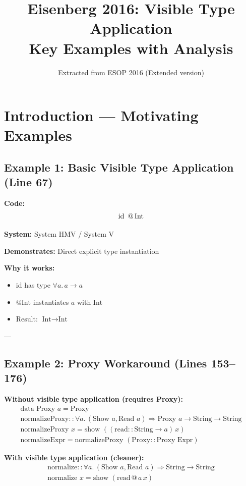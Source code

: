 \documentclass[11pt,a4paper]{article}
\title{Eisenberg 2016: Visible Type Application \\ Key Examples with Analysis}
\author{Extracted from ESOP 2016 (Extended version)}
\date{}
\begin{document}
\maketitle

\tableofcontents

\section{Introduction --- Motivating Examples}

\subsection{Example 1: Basic Visible Type Application (Line 67)}

\textbf{Code:}
\[
\text{id \,@\,Int}
\]

\textbf{System:} System HMV / System V

\textbf{Demonstrates:} Direct explicit type instantiation

\textbf{Why it works:}
\begin{itemize}
\item $\text{id}$ has type $\forall a.\, a \to a$
\item $@\text{Int}$ instantiates $a$ with $\text{Int}$
\item Result: $\text{Int} \to \text{Int}$
\end{itemize}

---

\subsection{Example 2: Proxy Workaround (Lines 153--176)}

\textbf{Without visible type application (requires Proxy):}
\[
\begin{array}{l}
\text{data Proxy } a = \text{Proxy} \\[6pt]
\text{normalizeProxy} :: \forall a.\, (\text{Show } a, \text{Read } a) \Rightarrow \text{Proxy } a \to \text{String} \to \text{String} \\
\text{normalizeProxy } x = \text{show } ((\text{read} :: \text{String} \to a)\, x) \\[6pt]
\text{normalizeExpr} = \text{normalizeProxy } (\text{Proxy} :: \text{Proxy Expr})
\end{array}
\]

\textbf{With visible type application (cleaner):}
\[
\begin{array}{l}
\text{normalize} :: \forall a.\, (\text{Show } a, \text{Read } a) \Rightarrow \text{String} \to \text{String} \\
\text{normalize } x = \text{show } (\text{read} \,@\,a\, x)
\end{array}
\]
\end{document}
